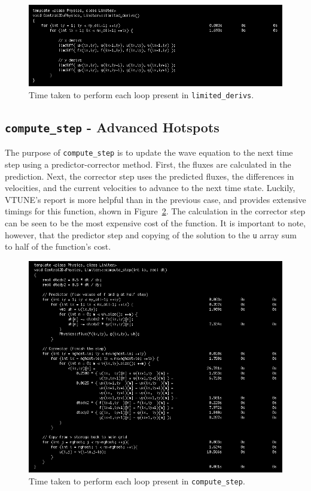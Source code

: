 \documentclass[12pt]{article}
\begin{document}
		\begin{figure}[h]
			\begin{center}
				\includegraphics[width=0.7\columnwidth]{init_lim_deriv}
				\caption{Time taken to perform each loop present in \texttt{limited\_derivs}.}
				\label{init_lim_deriv}
			\end{center}
		\end{figure}
		
		\subsection{\texttt{compute\_step} - Advanced Hotspots}
		The purpose of \texttt{compute\_step} is to update the wave equation to the next time step using a predictor-corrector method. First, the fluxes are calculated in the prediction. Next, the corrector step uses the predicted fluxes, the differences in velocities, and the current velocities to advance to the next time state. Luckily, VTUNE's report is more helpful than in the previous case, and provides extensive timings for this function, shown in Figure~\ref{init_compute_step}. The calculation in the corrector step can be seen to be the most expensive cost of the function. It is important to note, however, that the predictor step and copying of the solution to the \texttt{u} array sum to half of the function's cost.
		\begin{figure}[h]
			\begin{center}
				\includegraphics[width=0.7\columnwidth]{init_compute_step}
				\caption{Time taken to perform each loop present in \texttt{compute\_step}.}
				\label{init_compute_step}
			\end{center}
		\end{figure}	
		
\end{document}
